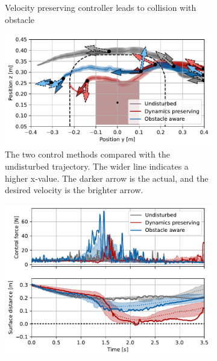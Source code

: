 \begin{figure}
\begin{subfigure}{\columnwidth}
      \caption{Velocity preserving controller leads to collision with obstacle}
      \label{fig:franka_sequence_obstacle_aware}
    \end{subfigure}
    \begin{subfigure}{\columnwidth}
      \centerline{\includegraphics[width=\textwidth]{figures/robot_arm_trajectory_xyz}}
      \caption{The two control methods compared with the undisturbed trajectory. The wider line indicates a higher x-value. The darker arrow is the actual, and the desired velocity is the brighter arrow.}
      \label{fig:robot_arm_trajectory_xyz}
    \end{subfigure}
    \begin{subfigure}{\columnwidth}
		\includegraphics[width=\textwidth]{figures/trajectory_comparison_force_and_distance}

\end{subfigure}
\end{figure}
